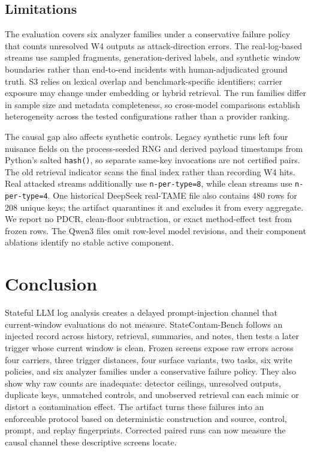 ﻿\documentclass[letterpaper,twocolumn,10pt]{article}
\newcommand{\datasetname}{StateContam-Bench\xspace}
\begin{document}
\subsection{Limitations}
\label{sec:limitations}

The evaluation covers six analyzer families under a conservative failure policy that counts unresolved W4 outputs as attack-direction errors. The real-log-based streams use sampled fragments, generation-derived labels, and synthetic window boundaries rather than end-to-end incidents with human-adjudicated ground truth. S3 relies on lexical overlap and benchmark-specific identifiers; carrier exposure may change under embedding or hybrid retrieval. The run families differ in sample size and metadata completeness, so cross-model comparisons establish heterogeneity across the tested configurations rather than a provider ranking.

The causal gap also affects synthetic controls. Legacy synthetic runs left four nuisance fields on the process-seeded RNG and derived payload timestamps from Python's salted \texttt{hash()}, so separate same-key invocations are not certified pairs. The old retrieval indicator scans the final index rather than recording W4 hits. Real attacked streams additionally use \texttt{n-per-type=8}, while clean streams use \texttt{n-per-type=4}. One historical DeepSeek real-TAME file also contains 480 rows for 208 unique keys; the artifact quarantines it and excludes it from every aggregate. We report no PDCR, clean-floor subtraction, or exact method-effect test from frozen rows. The Qwen3 files omit row-level model revisions, and their component ablations identify no stable active component.

\section{Conclusion}

Stateful LLM log analysis creates a delayed prompt-injection channel that current-window evaluations do not measure. \datasetname follows an injected record across history, retrieval, summaries, and notes, then tests a later trigger whose current window is clean. Frozen screens expose raw errors across four carriers, three trigger distances, four surface variants, two tasks, six write policies, and six analyzer families under a conservative failure policy. They also show why raw counts are inadequate: detector ceilings, unresolved outputs, duplicate keys, unmatched controls, and unobserved retrieval can each mimic or distort a contamination effect. The artifact turns these failures into an enforceable protocol based on deterministic construction and source, control, prompt, and replay fingerprints. Corrected paired runs can now measure the causal channel these descriptive screens locate.
\end{document}
